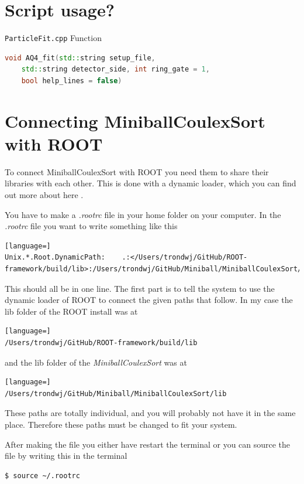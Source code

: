 \documentclass[twoside,english]{uiofysmaster/uiofysmaster}
\begin{document}
\begin{appendices}
\section{Script usage?}

\texttt{ParticleFit.cpp} \newline
Function 
\begin{lstlisting}[language=c++]
void AQ4_fit(std::string setup_file, 
	std::string detector_side, int ring_gate = 1, 
	bool help_lines = false)
\end{lstlisting}



\section{Connecting MiniballCoulexSort with ROOT}
To connect MiniballCoulexSort with ROOT you need them to share their libraries with each other. This is done with a dynamic loader, which you can find out more about here \cite{ROOTdynLoader}. 

You have to make a \textit{.rootrc} file in your home folder on your computer. In the \textit{.rootrc} file you want to write something like this 
\begin{lstlisting}[language=]
Unix.*.Root.DynamicPath:    .:</Users/trondwj/GitHub/ROOT-framework/build/lib>:/Users/trondwj/GitHub/Miniball/MiniballCoulexSort/lib:
\end{lstlisting}
This should all be in one line. The first part is to tell the system to use the dynamic loader of ROOT to connect the given paths that follow. In my case the lib folder of the ROOT install was at 
\begin{lstlisting}[language=]
/Users/trondwj/GitHub/ROOT-framework/build/lib
\end{lstlisting}
and the lib folder of the \textsl{MiniballCoulexSort} was at
\begin{lstlisting}[language=]
/Users/trondwj/GitHub/Miniball/MiniballCoulexSort/lib
\end{lstlisting}
These paths are totally individual, and you will probably not have it in the same place. Therefore these paths must be changed to fit your system. 

After making the file you either have restart the terminal or you can source the file by writing this in the terminal
\begin{lstlisting}[language=sh]
$ source ~/.rootrc
\end{lstlisting}




\end{appendices}
\end{document}
